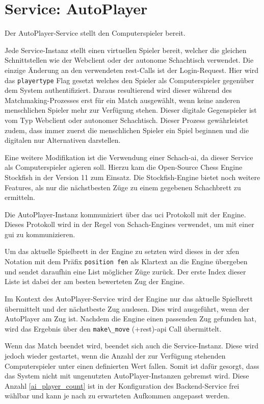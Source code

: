 \hypertarget{service-autoplayer}{%
\section{Service: AutoPlayer}\label{service-autoplayer}}

Der AutoPlayer-Service stellt den Computerspieler bereit.

Jede Service-Instanz stellt einen virtuellen Spieler bereit, welcher die
gleichen Schnittstellen wie der Webclient oder der autonome Schachtisch
verwendet. Die einzige Änderung an den verwendeten \gls{rest}-Calls ist
der Login-Request. Hier wird das \passthrough{\lstinline!playertype!}
Flag gesetzt welches den Spieler als Computerspieler gegenüber dem
System authentifiziert. Daraus resultierend wird dieser während des
Matchmaking-Prozesses erst für ein Match ausgewählt, wenn keine anderen
menschlichen Spieler mehr zur Verfügung stehen. Dieser digitale
Gegenspieler ist vom Typ Webclient oder autonomer Schachtisch. Dieser
Prozess gewährleistet zudem, dass immer zuerst die menschlichen Spieler
ein Spiel beginnen und die digitalen nur Alternativen darstellen.

Eine weitere Modifikation ist die Verwendung einer Schach-\gls{ai}, da
dieser Service als Computerspieler agieren soll. Hierzu kam die
Open-Source Chess Engine Stockfish\cite{stockfish} in der Version 11
zum Einsatz. Die Stockfish-Engine bietet noch weitere Features, als nur
die nächstbesten Züge zu einem gegebenen Schachbrett zu ermitteln.

Die AutoPlayer-Instanz kommuniziert über das \gls{uci}
Protokoll\cite{uciprotocol} mit der Engine. Dieses Protokoll wird in
der Regel von Schach-Engines verwendet, um mit einer \gls{gui} zu
kommunizieren.

Um das aktuelle Spielbrett in der Engine zu setzten wird dieses in der
\gls{xfen} Notation mit dem Präfix
\passthrough{\lstinline!position fen!} als Klartext an die Engine
übergeben und sendet daraufhin eine List möglicher Züge zurück. Der
erste Index dieser Liste ist dabei der am besten bewerteten Zug der
Engine.

Im Kontext des AutoPlayer-Service wird der Engine nur das aktuelle
Spielbrett übermittelt und der nächstbeste Zug auslesen. Dies wird
ausgeführt, wenn der AutoPlayer am Zug ist. Nachdem die Engine einen
passenden Zug gefunden hat, wird das Ergebnis über den
\passthrough{\lstinline!make\_move!} (+rest)-\gls{api} Call übermittelt.

Wenn das Match beendet wird, beendet sich auch die Service-Instanz.
Diese wird jedoch wieder gestartet, wenn die Anzahl der zur Verfügung
stehenden Computerspieler unter einen definierten Wert fallen. Somit ist
dafür gesorgt, dass das System nicht mit ungenutzten
AutoPlayer-Instanzen gebremst wird. Diese Anzahl \ref{ai_player_count}
ist in der Konfiguration des Backend-Service frei wählbar und kann je
nach zu erwarteten Aufkommen angepasst werden.

